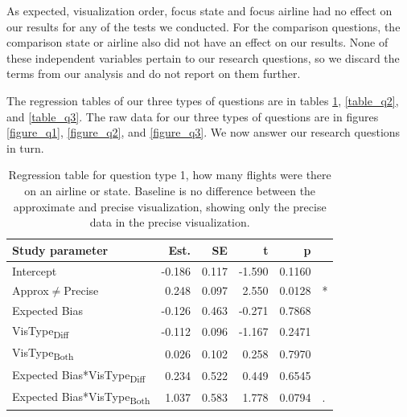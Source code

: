\documentclass[10pt,journal,compsoc]{IEEEtran}
\begin{document}
As expected, visualization order, focus state and focus airline had no effect on our results for any of the tests we conducted.
For the comparison questions, the comparison state or airline also did not have an effect on our results.
None of these independent variables pertain to our research questions, so we discard the terms from our analysis and do not report on them further.

The regression tables of our three types of questions are in tables \ref{table_q1}, \ref{table_q2}, and \ref{table_q3}.
The raw data for our three types of questions are in figures \ref{figure_q1}, \ref{figure_q2}, and \ref{figure_q3}.
We now answer our research questions in turn.

\begin{table}[!t]
\renewcommand{\arraystretch}{1.3}
\caption{Regression table for question type 1, how many flights were there on an airline or state. Baseline is no difference between the approximate and precise visualization, showing only the precise data in the precise visualization.}
\label{table_q1}
\centering
\begin{tabular}{|l||r|r|r|r@{}l|}
\hline
Study parameter & Est. & SE & t & p & \\
\hline
\hline
Intercept & -0.186 & 0.117 & -1.590 & 0.1160 &  \\
\hline
Approx$\neq$Precise & 0.248 & 0.097 & 2.550 & 0.0128 & * \\
\hline
Expected Bias & -0.126 & 0.463 & -0.271 & 0.7868 &  \\
\hline
VisType\textsubscript{Diff} & -0.112 & 0.096 & -1.167 & 0.2471 &  \\
\hline
VisType\textsubscript{Both} & 0.026 & 0.102 & 0.258 & 0.7970 &  \\
\hline
Expected Bias*VisType\textsubscript{Diff} & 0.234 & 0.522 & 0.449 & 0.6545 &  \\
\hline
Expected Bias*VisType\textsubscript{Both} & 1.037 & 0.583 & 1.778 & 0.0794 & . \\
\hline
\end{tabular}
\end{table}
\end{document}

